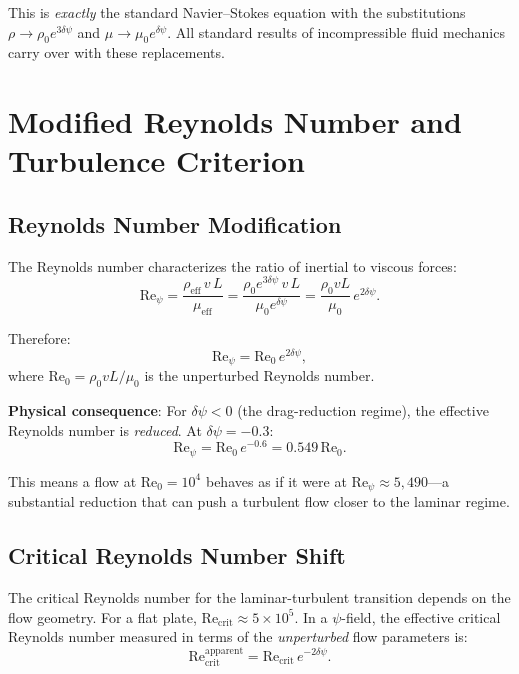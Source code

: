 \documentclass[12pt,twocolumn]{article}
\newcommand{\Reff}{\mathrm{eff}}
\newcommand{\Rey}{\mathrm{Re}}
\newcommand{\dpsi}{\delta\psi}
\begin{document}
This is \emph{exactly} the standard Navier--Stokes equation with the
substitutions $\rho \to \rho_0 e^{3\dpsi}$ and $\mu \to \mu_0 e^{\dpsi}$.
All standard results of incompressible fluid mechanics carry over with these
replacements.

\section{Modified Reynolds Number and Turbulence Criterion}
\label{sec:reynolds}

\subsection{Reynolds Number Modification}

The Reynolds number characterizes the ratio of inertial to viscous forces:
\begin{equation}
\Rey_\psi = \frac{\rho_\Reff\,v\,L}{\mu_\Reff}
= \frac{\rho_0 e^{3\dpsi}\,v\,L}{\mu_0 e^{\dpsi}}
= \frac{\rho_0 v L}{\mu_0}\,e^{2\dpsi}.
\end{equation}

Therefore:
\begin{equation}
\boxed{\Rey_\psi = \Rey_0\,e^{2\dpsi},}
\label{eq:re_psi}
\end{equation}
where $\Rey_0 = \rho_0 v L/\mu_0$ is the unperturbed Reynolds number.

\textbf{Physical consequence}: For $\dpsi < 0$ (the drag-reduction regime),
the effective Reynolds number is \emph{reduced}. At $\dpsi = -0.3$:
\begin{equation}
\Rey_\psi = \Rey_0\,e^{-0.6} = 0.549\,\Rey_0.
\end{equation}

This means a flow at $\Rey_0 = 10^4$ behaves as if it were at
$\Rey_\psi \approx 5{,}490$---a substantial reduction that can push a
turbulent flow closer to the laminar regime.

\subsection{Critical Reynolds Number Shift}

The critical Reynolds number for the laminar-turbulent transition depends
on the flow geometry. For a flat plate, $\Rey_\mathrm{crit} \approx
5\times10^5$. In a $\psi$-field, the effective critical Reynolds number
measured in terms of the \emph{unperturbed} flow parameters is:
\begin{equation}
\Rey_\mathrm{crit}^\mathrm{apparent} = \Rey_\mathrm{crit}\,e^{-2\dpsi}.
\end{equation}
\end{document}
